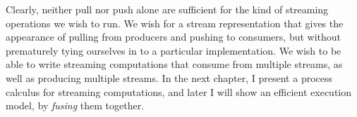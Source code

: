 Clearly, neither pull nor push alone are sufficient for the kind of streaming operations we wish to run.
We wish for a stream representation that gives the appearance of pulling from producers and pushing to consumers, but without prematurely tying ourselves in to a particular implementation.
We wish to be able to write streaming computations that consume from multiple streams, as well as producing multiple streams.
In the next chapter, I present a process calculus for streaming computations, and later I will show an efficient execution model, by \emph{fusing} them together.

